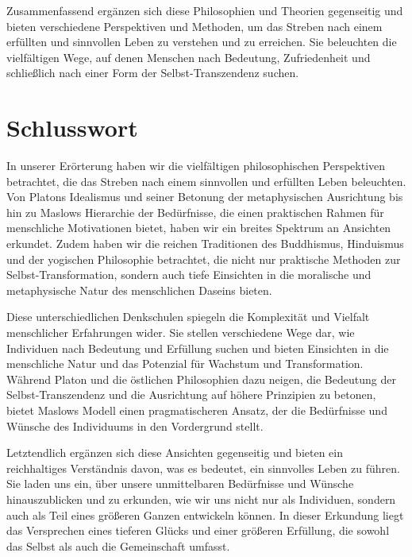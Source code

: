 \documentclass[12pt,a4paper]{article}
\begin{document}
Zusammenfassend ergänzen sich diese Philosophien und Theorien gegenseitig und bieten verschiedene Perspektiven und Methoden, um das Streben nach einem erfüllten und sinnvollen Leben zu verstehen und zu erreichen. Sie beleuchten die vielfältigen Wege, auf denen Menschen nach Bedeutung, Zufriedenheit und schließlich nach einer Form der Selbst-Transzendenz suchen.


\section{Schlusswort}
In unserer Erörterung haben wir die vielfältigen philosophischen Perspektiven betrachtet, die das Streben nach einem sinnvollen und erfüllten Leben beleuchten. Von Platons Idealismus und seiner Betonung der metaphysischen Ausrichtung bis hin zu Maslows Hierarchie der Bedürfnisse, die einen praktischen Rahmen für menschliche Motivationen bietet, haben wir ein breites Spektrum an Ansichten erkundet. Zudem haben wir die reichen Traditionen des Buddhismus, Hinduismus und der yogischen Philosophie betrachtet, die nicht nur praktische Methoden zur Selbst-Transformation, sondern auch tiefe Einsichten in die moralische und metaphysische Natur des menschlichen Daseins bieten.

Diese unterschiedlichen Denkschulen spiegeln die Komplexität und Vielfalt menschlicher Erfahrungen wider. Sie stellen verschiedene Wege dar, wie Individuen nach Bedeutung und Erfüllung suchen und bieten Einsichten in die menschliche Natur und das Potenzial für Wachstum und Transformation. Während Platon und die östlichen Philosophien dazu neigen, die Bedeutung der Selbst-Transzendenz und die Ausrichtung auf höhere Prinzipien zu betonen, bietet Maslows Modell einen pragmatischeren Ansatz, der die Bedürfnisse und Wünsche des Individuums in den Vordergrund stellt.

Letztendlich ergänzen sich diese Ansichten gegenseitig und bieten ein reichhaltiges Verständnis davon, was es bedeutet, ein sinnvolles Leben zu führen. Sie laden uns ein, über unsere unmittelbaren Bedürfnisse und Wünsche hinauszublicken und zu erkunden, wie wir uns nicht nur als Individuen, sondern auch als Teil eines größeren Ganzen entwickeln können. In dieser Erkundung liegt das Versprechen eines tieferen Glücks und einer größeren Erfüllung, die sowohl das Selbst als auch die Gemeinschaft umfasst.

\newpage

\printbibliography
\end{document}
